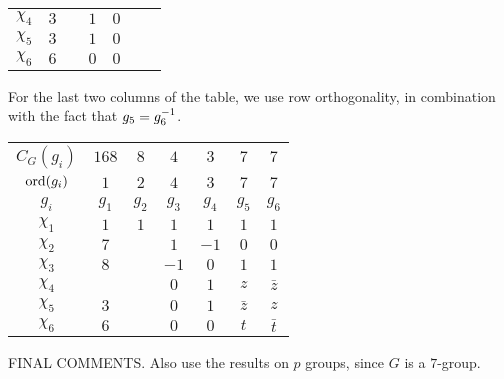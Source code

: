 \begin{boxexample}[Constructing the Character Table of $G = \PSL{2, 7}$]
\begin{table}[H]
\begin{subtable}{0.45\linewidth}
\begin{tabular}{|c|cccccc|}
                $\chi_4$ & $3$ & & $1$ & $0$ & & \\
                $\chi_5$ & $3$ & & $1$ & $0$ & & \\
                $\chi_6$ & $6$ & & $0$ & $0$ & & \\
            \end{tabular}
        \end{subtable}
    \end{table}
    For the last two columns of the table, we use row orthogonality, in combination with the fact that $g_5 = g_6^{-1}$.
    \begin{table}[H]
        \centering
        \begin{tabular}{|c|cccccc|}
            $C_G(g_i)$ & $168$ & $8$ & $4$ & $3$ & $7$ & $7$ \\
            $\operatorname{ord}\!\left( g_i \right)$ & $1$ & $2$ & $4$ & $3$ & $7$ & $7$ \\
            $g_i$ & $g_1$ & $g_2$ & $g_3$ & $g_4$ & $g_5$ & $g_6$ \\
            \hline
            $\chi_1$ & $1$ & $1$ & $1$ & $1$ & $1$ & $1$ \\
            $\chi_2$ & $7$ & & $1$ & $-1$ & $0$ & $0$ \\
            $\chi_3$ & $8$ & & $-1$ & $0$ & $1$ & $1$ \\
            $\chi_4$ & & & $0$ & $1$ & $z$ & $\bar{z}$ \\
            $\chi_5$ & $3$ & & $0$ & $1$ & $\bar{z}$ & $z$ \\
            $\chi_6$ & $6$ & & $0$ & $0$ & $t$ & $\bar{t}$ \\
        \end{tabular}
    \end{table}

    FINAL COMMENTS. Also use the results on $p$ groups, since $G$ is a $7$-group.
\end{boxexample}